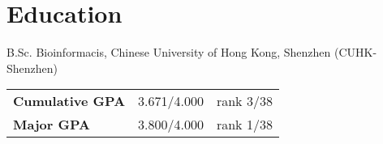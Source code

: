 \documentclass[12pt,a4paper,sans]{moderncv}
\newcommand{\cvsection}[1]{\section{{#1}}}
\begin{document}
\maketitle


\cvsection{Education}
    {B.Sc.}
    {}
    {Bioinformacis, Chinese University of Hong Kong, Shenzhen (CUHK-Shenzhen)}
    {}
    {\begin{tabular}{@{}lrr@{}}
        \textbf{Cumulative GPA} & 3.671/4.000 & rank 3/38\\
        \textbf{Major GPA} & 3.800/4.000 & rank 1/38\\
    \end{tabular}}




\end{document}

